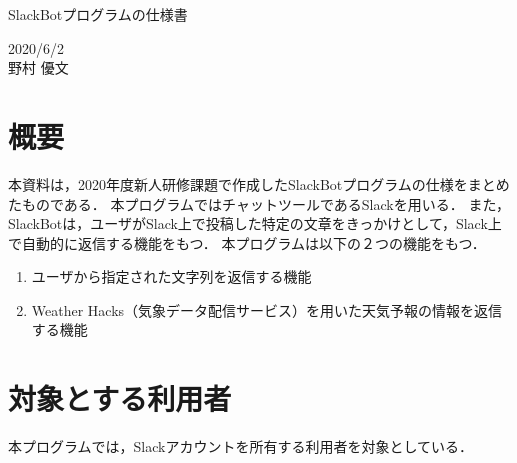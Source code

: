 \documentclass[12pt]{jsarticle}
\begin{document}
\begin{center}
{\LARGE SlackBotプログラムの仕様書}
\end{center}

\begin{flushright}
  2020/6/2\\
  野村 優文
\end{flushright}
\section{概要}
\label{sec:introduction}
本資料は，2020年度新人研修課題で作成したSlackBotプログラムの仕様をまとめたものである．
本プログラムではチャットツールであるSlack\cite{Slack}を用いる．
また，SlackBotは，ユーザがSlack上で投稿した特定の文章をきっかけとして，Slack上で自動的に返信する機能をもつ．
本プログラムは以下の２つの機能をもつ．

\begin{enumerate}
\item ユーザから指定された文字列を返信する機能
\item Weather Hacks（気象データ配信サービス）\cite{Weather_Hacks}を用いた天気予報の情報を返信する機能
\end{enumerate}

\section{対象とする利用者}
本プログラムでは，Slackアカウントを所有する利用者を対象としている．


\end{document}
